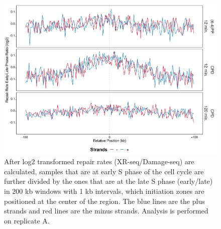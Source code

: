 \begin{figure}[H]
\begin{center}
\includegraphics[width=\textwidth]{Chapters/7_appendix/figures/supfig40}
\caption[Repair rate early/late ratio of initiation zones in 200 kb (replicate A).]{After log2 transformed repair rates (XR-seq/Damage-seq) are calculated, samples that are at early S phase of the cell cycle are further divided by the ones that are at the late S phase (early/late) in 200 kb windows with 1 kb intervals, which initiation zones are positioned at the center of the region. The blue lines are the plus strands and red lines are the minus strands. Analysis is performed on replicate A.}
\label{supfig:rrel200inzonesA}
\end{center}
\end{figure}

